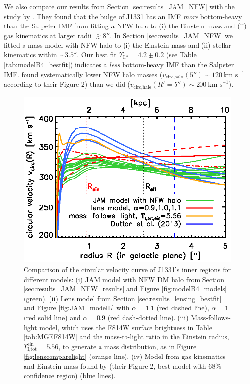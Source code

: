 \documentclass[useAMS,usenatbib]{mnras}
\begin{document}
We also compare our results from Section \ref{sec:results_JAM_NFW} with the study by \citet{SWELLSV}. They found that the bulge of J1331 has an IMF \emph{more} bottom-heavy than the Salpeter IMF from fitting a NFW halo to (i) the Einstein mass and (ii) gas kinematics at larger radii $\gtrsim 8''$. In Section \ref{sec:results_JAM_NFW} we fitted a mass model with NFW halo to (i) the Einstein mass and (ii) stellar kinematics within $\sim 3.5''$. Our best fit $\Upsilon_\text{I,*} = 4.2 \pm 0.2$ (see Table \ref{tab:modelB4_bestfit}) indicates a \emph{less} bottom-heavy IMF than the Salpeter IMF. \cite{SWELLSV} found systematically lower NFW halo masses ($v_\text{circ,halo}(5'') \sim 120~\text{km s}^{-1}$ according to their Figure 2) than we did ($v_\text{circ,halo}(R'=5'') \sim 200~\text{km s}^{-1}$).

\begin{figure}
\centering
\includegraphics[width=0.9\linewidth]{B4_jam_profiles_errors_short_vcirc.ps}
\caption{Comparison of the circular velocity curve of J1331's inner regions for different models: (i) JAM model with NFW DM halo from Section \ref{sec:results_JAM_NFW_results} and Figure \ref{fig:modelB4_models} (green). (ii) Lens model from Section \ref{sec:results_lensing_bestfit} and Figure \ref{fig:JAM_modelL} with $\alpha = 1.1$ (red dashed line), $\alpha = 1$ (red solid line) and $\alpha=0.9$ (red dash-dotted line). (iii) Mass-follows-light model, which uses the F814W surface brightness in Table \ref{tab:MGEF814W} and the mass-to-light ratio in the Einstein radius, $\Upsilon^\text{ein}_\text{I,tot} = 5.56$, to generate a mass distribution, as in Figure \ref{fig:lenscomparelight} (orange line).  (iv) Model from gas kinematics and Einstein mass found by \citet{SWELLSV} (their Figure 2, best model with 68\% confidence region) (blue lines).}
\label{fig:vcirc_comparison}
\end{figure}
\end{document}
